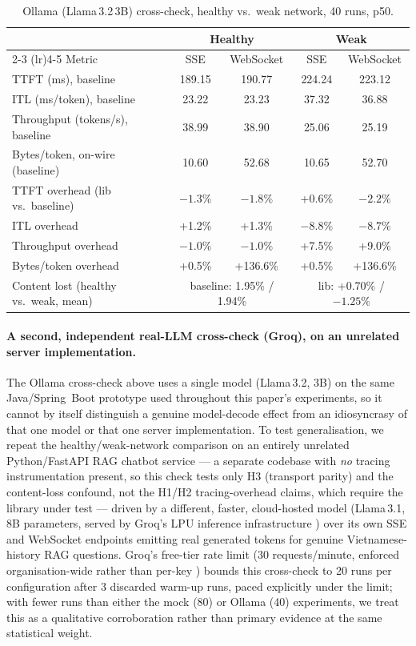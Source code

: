 \documentclass[11pt]{article}
\begin{document}
\begin{table}[H]
\centering\footnotesize
\caption{Ollama (Llama\,3.2\,3B) cross-check, healthy vs.\ weak network, 40 runs, p50.}
\label{tab:ollama}
\begin{tabular}{@{}lcccc@{}}
\toprule
 & \multicolumn{2}{c}{Healthy} & \multicolumn{2}{c}{Weak} \\
\cmidrule(lr){2-3} \cmidrule(lr){4-5}
Metric & SSE & WebSocket & SSE & WebSocket \\
\midrule
TTFT (ms), baseline & 189.15 & 190.77 & 224.24 & 223.12 \\
ITL (ms/token), baseline & 23.22 & 23.23 & 37.32 & 36.88 \\
Throughput (tokens/s), baseline & 38.99 & 38.90 & 25.06 & 25.19 \\
Bytes/token, on-wire (baseline) & 10.60 & 52.68 & 10.65 & 52.70 \\
\midrule
TTFT overhead (lib vs.\ baseline) & $-1.3\%$ & $-1.8\%$ & +0.6\% & $-2.2\%$ \\
ITL overhead & +1.2\% & +1.3\% & $-8.8\%$ & $-8.7\%$ \\
Throughput overhead & $-1.0\%$ & $-1.0\%$ & +7.5\% & +9.0\% \\
Bytes/token overhead & +0.5\% & +136.6\% & +0.5\% & +136.6\% \\
Content lost (healthy vs.\ weak, mean) & \multicolumn{2}{c}{baseline: 1.95\% / 1.94\%} & \multicolumn{2}{c}{lib: +0.70\% / $-1.25\%$} \\
\bottomrule
\end{tabular}
\end{table}

\paragraph{A second, independent real-LLM cross-check (Groq), on an unrelated server implementation.} The Ollama cross-check above uses a single model (Llama\,3.2, 3B) on the same Java/Spring~Boot prototype used throughout this paper's experiments, so it cannot by itself distinguish a genuine model-decode effect from an idiosyncrasy of that one model or that one server implementation. To test generalisation, we repeat the healthy/weak-network comparison on an entirely unrelated Python/FastAPI RAG chatbot service --- a separate codebase with \emph{no} tracing instrumentation present, so this check tests only H3 (transport parity) and the content-loss confound, not the H1/H2 tracing-overhead claims, which require the library under test --- driven by a different, faster, cloud-hosted model (Llama\,3.1, 8B parameters, served by Groq's LPU inference infrastructure \cite{groqdocs}) over its own SSE and WebSocket endpoints emitting real generated tokens for genuine Vietnamese-history RAG questions. Groq's free-tier rate limit (30 requests/minute, enforced organisation-wide rather than per-key \cite{groqdocs}) bounds this cross-check to 20 runs per configuration after 3 discarded warm-up runs, paced explicitly under the limit; with fewer runs than either the mock (80) or Ollama (40) experiments, we treat this as a qualitative corroboration rather than primary evidence at the same statistical weight.
\end{document}
